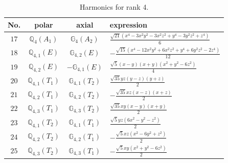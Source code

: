 \documentclass[fleqn,8pt,landscape]{jsarticle}
\begin{document}
\begin{table}[ht!]
\begin{center}
\caption{Harmonics for rank 4.}
\renewcommand{\arraystretch}{1.3}
\begin{tabular}{cccl} \hline \hline
No. & polar & axial & expression \\ \hline
$ 17 $ & $ \mathbb{Q}_{4}(A_{1}) $ & $ \mathbb{G}_{4}(A_{2}) $ & $ \frac{\sqrt{21} \left(x^{4} - 3 x^{2} y^{2} - 3 x^{2} z^{2} + y^{4} - 3 y^{2} z^{2} + z^{4}\right)}{6} $ \\
$ 18 $ & $ \mathbb{Q}_{4,1}(E) $ & $ \mathbb{G}_{4,2}(E) $ & $ - \frac{\sqrt{15} \left(x^{4} - 12 x^{2} y^{2} + 6 x^{2} z^{2} + y^{4} + 6 y^{2} z^{2} - 2 z^{4}\right)}{12} $ \\
$ 19 $ & $ \mathbb{Q}_{4,2}(E) $ & $ -\mathbb{G}_{4,1}(E) $ & $ \frac{\sqrt{5} \left(x - y\right) \left(x + y\right) \left(x^{2} + y^{2} - 6 z^{2}\right)}{4} $ \\
$ 20 $ & $ \mathbb{Q}_{4,1}(T_{1}) $ & $ \mathbb{G}_{4,1}(T_{2}) $ & $ \frac{\sqrt{35} y z \left(y - z\right) \left(y + z\right)}{2} $ \\
$ 21 $ & $ \mathbb{Q}_{4,2}(T_{1}) $ & $ \mathbb{G}_{4,2}(T_{2}) $ & $ - \frac{\sqrt{35} x z \left(x - z\right) \left(x + z\right)}{2} $ \\
$ 22 $ & $ \mathbb{Q}_{4,3}(T_{1}) $ & $ \mathbb{G}_{4,3}(T_{2}) $ & $ \frac{\sqrt{35} x y \left(x - y\right) \left(x + y\right)}{2} $ \\
$ 23 $ & $ \mathbb{Q}_{4,1}(T_{2}) $ & $ \mathbb{G}_{4,1}(T_{1}) $ & $ \frac{\sqrt{5} y z \left(6 x^{2} - y^{2} - z^{2}\right)}{2} $ \\
$ 24 $ & $ \mathbb{Q}_{4,2}(T_{2}) $ & $ \mathbb{G}_{4,2}(T_{1}) $ & $ - \frac{\sqrt{5} x z \left(x^{2} - 6 y^{2} + z^{2}\right)}{2} $ \\
$ 25 $ & $ \mathbb{Q}_{4,3}(T_{2}) $ & $ \mathbb{G}_{4,3}(T_{1}) $ & $ - \frac{\sqrt{5} x y \left(x^{2} + y^{2} - 6 z^{2}\right)}{2} $ \\
 \hline \hline
\end{tabular}
\end{center}
\end{table}
\end{document}
